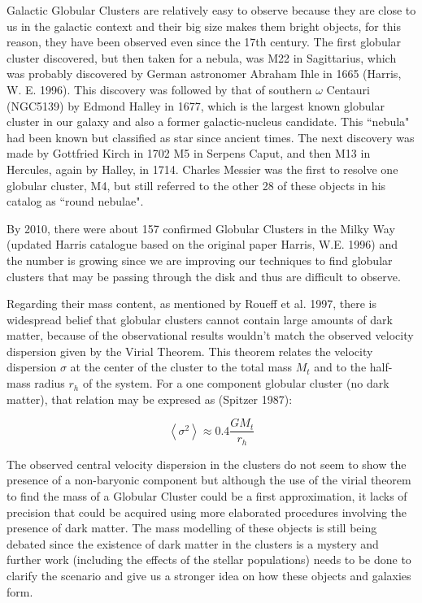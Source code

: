 Galactic Globular Clusters are relatively easy to observe because they are close to us in the galactic context and their big size makes them bright objects, for this reason, they have been observed even since the 17th century. The first globular cluster discovered, but then taken for a nebula, was M22 in Sagittarius, which was probably discovered by German astronomer Abraham Ihle in 1665 (Harris, W. E. 1996). This discovery was followed by that of southern $\omega$ Centauri (NGC5139) by Edmond Halley in 1677, which is the largest known globular cluster in our galaxy and also a former galactic-nucleus candidate. This ``nebula" had been known but classified as star since ancient times. The next discovery was made by Gottfried Kirch in 1702 M5 in Serpens Caput, and then M13 in Hercules, again by Halley, in 1714. Charles Messier was the first to resolve one globular cluster, M4, but still referred to the other 28 of these objects in his catalog as ``round nebulae". 

By 2010, there were about 157 confirmed Globular Clusters in the Milky Way (updated Harris catalogue based on the original paper Harris, W.E. 1996) and the number is growing since we are improving our techniques to find globular clusters that may be passing through the disk and thus are difficult to observe.

Regarding their mass content, as mentioned by Roueff et al. 1997, there is  widespread belief that globular clusters cannot contain large amounts of dark matter, because of the observational results wouldn't match the observed velocity dispersion given by the Virial Theorem. This theorem relates the velocity dispersion $ \sigma $ at the center of the cluster to the total mass $M_{t}$ and to the half-mass radius $r_{h}$ of the system. For a one component globular cluster (no dark matter), that relation may be expresed as (Spitzer 1987):

\begin{equation}
\left\langle \sigma^{2}\right\rangle \approx0.4\frac{GM_{t}}{r_{h}}
\end{equation}

The observed central velocity dispersion in the clusters do not seem to show the presence of a non-baryonic component but although the use of the virial theorem to find the mass of a Globular Cluster could be a first approximation, it lacks of precision that could be acquired using more elaborated procedures involving the presence of dark matter. The mass modelling of these objects is still being debated since the existence of dark matter in the clusters is a mystery and further work (including the effects of the stellar populations) needs to be done to clarify the scenario and give us a stronger idea on how these objects and galaxies form. 

